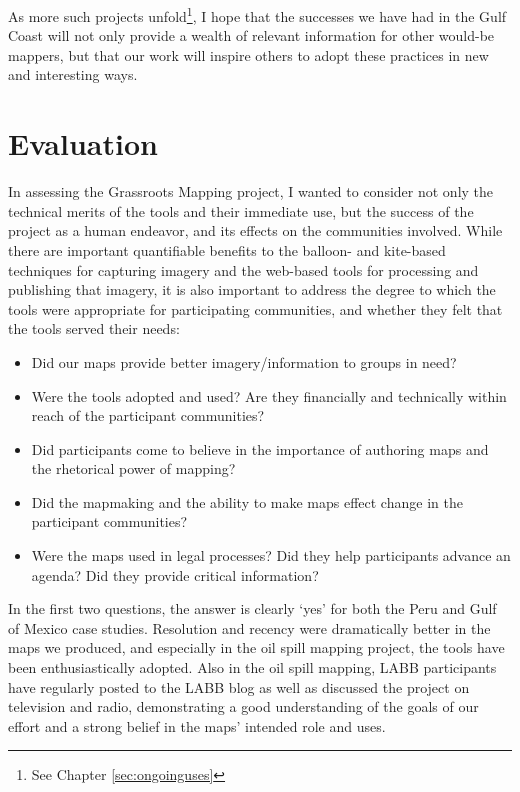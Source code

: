\documentclass[11pt,oneside,notitlepage]{report}
\begin{document}
{{As more such projects unfold\footnote{See Chapter \ref{sec:ongoinguses}}, I hope that the successes we have had in the Gulf Coast will not only provide a wealth of relevant information for other would-be mappers, but that our work will inspire others to adopt these practices in new and interesting ways.  

\chapter{Evaluation}

In assessing the Grassroots Mapping project, I wanted to consider not only the technical merits of the tools and their immediate use, but the success of the project as a human endeavor, and its effects on the communities involved. While there are important quantifiable benefits to the balloon- and kite-based techniques for capturing imagery and the web-based tools for processing and publishing that imagery, it is also important to address the degree to which the tools were appropriate for participating communities, and whether they felt that the tools served their needs: 

\begin{itemize}
\item Did our maps provide better imagery/information to groups in need?
\item Were the tools adopted and used? Are they financially and technically within reach of the participant communities? 
\item Did participants come to believe in the importance of authoring maps and the rhetorical power of mapping?
\item Did the mapmaking and the ability to make maps effect change in the participant communities?
\item Were the maps used in legal processes? Did they help participants advance an agenda? Did they provide critical information?
\end{itemize}

In the first two questions, the answer is clearly `yes' for both the Peru and Gulf of Mexico case studies. Resolution and recency were dramatically better in the maps we produced, and especially in the oil spill mapping project, the tools have been enthusiastically adopted. Also in the oil spill mapping, \ac{LABB} participants have regularly posted to the \ac{LABB} blog as well as discussed the project on television and radio, demonstrating a good understanding of the goals of our effort and a strong belief in the maps' intended role and uses. 

}}
\end{document}
